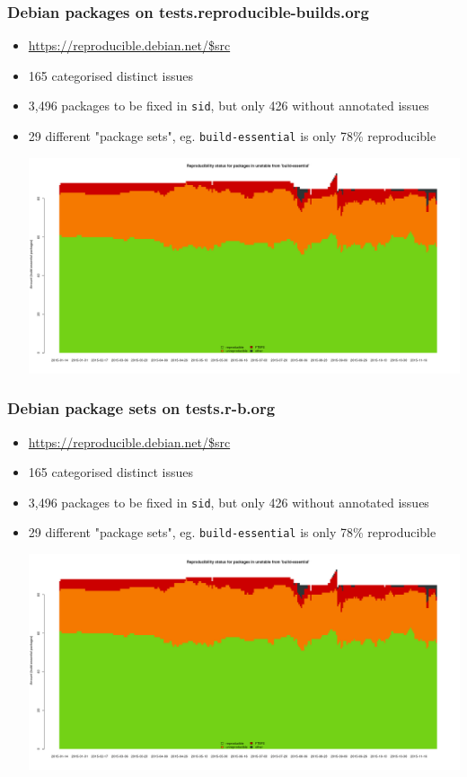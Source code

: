 \documentclass[14pt]{beamer}
\begin{document}
\begin{frame}
 \frametitle{Debian packages on tests.reproducible-builds.org}

 \begin{itemize}
  \item \url {https://reproducible.debian.net/$src}
  \item<2-3> { 165 categorised distinct issues }
  \item<2-3> { 3,496 packages to be fixed in \texttt{sid}, but only 426 without annotated
  issues }
  \item<3> { 29 different "package sets", eg. \texttt{build-essential} is only 78\%
  reproducible
   \begin{center}
    \includegraphics[height=0.5\paperheight]{images/stats_meta_pkg_state_build-essential.png}
   \vfill
 \end{center}
  }
 \end{itemize}
\end{frame}

\begin{frame}
 \frametitle{Debian package sets on tests.r-b.org}

 \begin{itemize}
  \item \url {https://reproducible.debian.net/$src}
  \item<2-3> { 165 categorised distinct issues }
  \item<2-3> { 3,496 packages to be fixed in \texttt{sid}, but only 426 without annotated
  issues }
  \item<3> { 29 different "package sets", eg. \texttt{build-essential} is only 78\%
  reproducible
   \begin{center}
    \includegraphics[height=0.5\paperheight]{images/stats_meta_pkg_state_build-essential.png}
   \vfill
 \end{center}
  }
 \end{itemize}
\end{frame}
\end{document}
